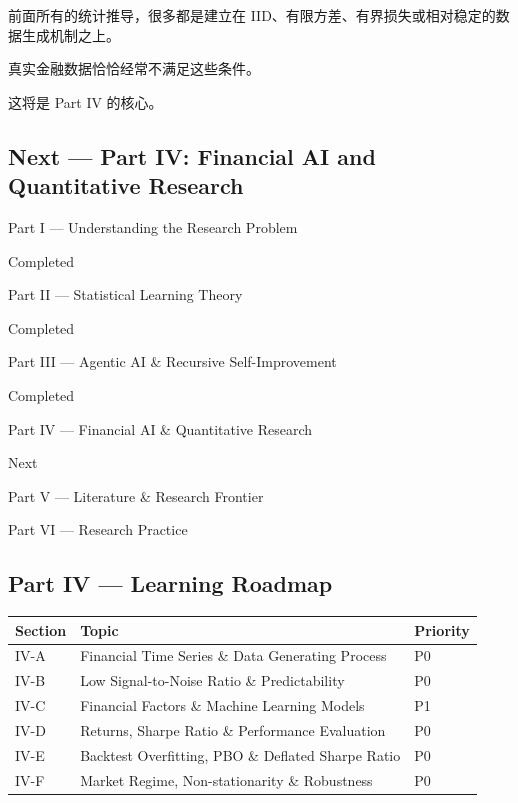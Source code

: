 前面所有的统计推导，很多都是建立在 IID、有限方差、有界损失或相对稳定的数据生成机制之上。

真实金融数据恰恰经常不满足这些条件。

这将是 Part IV 的核心。

\hypertarget{part-3-48-0001-next-part-iv-financial-ai-and-quantitative-research}{%
\subsection{Next --- Part IV: Financial AI and Quantitative Research}\label{part-3-48-0001-next-part-iv-financial-ai-and-quantitative-research}}

Part I --- Understanding the Research Problem

Completed

Part II --- Statistical Learning Theory

Completed

Part III --- Agentic AI \& Recursive Self-Improvement

Completed

Part IV --- Financial AI \& Quantitative Research

Next

Part V --- Literature \& Research Frontier

Part VI --- Research Practice

\hypertarget{part-3-48-0001-part-iv-learning-roadmap}{%
\subsection{Part IV --- Learning Roadmap}\label{part-3-48-0001-part-iv-learning-roadmap}}

\begin{readertable}
\begin{longtable}[]{@{}
  >{\raggedright\arraybackslash}p{}
  >{\raggedright\arraybackslash}p{}
  >{\raggedright\arraybackslash}p{}@{}}
\toprule
Section & Topic & Priority \\
\midrule
\endhead
IV-A & Financial Time Series \& Data Generating Process & P0 \\
IV-B & Low Signal-to-Noise Ratio \& Predictability & P0 \\
IV-C & Financial Factors \& Machine Learning Models & P1 \\
IV-D & Returns, Sharpe Ratio \& Performance Evaluation & P0 \\
IV-E & Backtest Overfitting, PBO \& Deflated Sharpe Ratio & P0 \\
IV-F & Market Regime, Non-stationarity \& Robustness & P0 \\
\bottomrule
\end{longtable}
\end{readertable}


